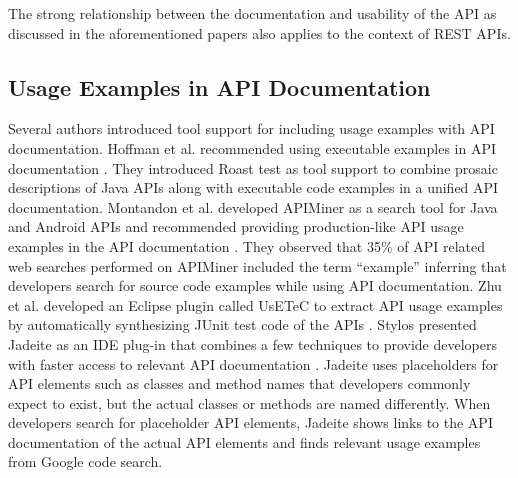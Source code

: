 \documentclass[10pt, conference]{IEEEtran}
\begin{document}
The strong relationship between the documentation and usability of the API as discussed in the aforementioned papers also applies to the context of REST APIs.

\subsection{Usage Examples in API Documentation} %


Several authors introduced tool support for including usage examples with API documentation. Hoffman et al. recommended using executable examples in API documentation \cite{Hoffman_api_documentation}. They introduced Roast test as tool support  to combine prosaic descriptions of Java APIs along with executable code examples in a unified API documentation. Montandon et al. developed APIMiner as a search tool for Java and Android APIs and recommended providing production-like API usage examples in the API documentation \cite{montandon2013documenting}. They observed that 35\% of API related web searches performed on APIMiner included the term “example” inferring that developers search for source code examples while using API documentation. Zhu et al. developed an Eclipse plugin called UsETeC to extract API usage examples by automatically synthesizing JUnit test code of the APIs \cite{zhu2014mining}. Stylos presented Jadeite as an IDE plug-in that combines a few techniques to provide developers with faster access to relevant API documentation \cite{Jadeite}. Jadeite uses placeholders for API elements such as classes and method names that developers commonly expect to exist, but the actual classes or methods are named differently. When developers search for placeholder API elements, Jadeite shows links to the API documentation of the actual API elements and finds relevant usage examples from Google code search.
\end{document}
